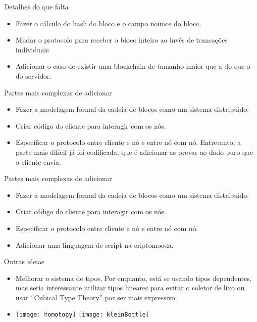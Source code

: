 \documentclass{beamer}
\begin{document}
\begin{frame}{Detalhes do que falta}
  \begin{itemize}
    \item Fazer o cálculo do hash do bloco e o campo nounce do bloco.
    \item Mudar o protocolo para receber o bloco inteiro ao invés de transações individuais
    \item Adicionar o caso de existir uma blockchain de tamanho maior que a do que a do servidor.
  \end{itemize}
\end{frame}

\begin{frame}{Partes mais complexas de adicionar}
  \begin{itemize}
    \item Fazer a modelagem formal da cadeia de blocos como um sistema distribuido.
    \item Criar código do cliente para interagir com os nós.
    \item Especificar o protocolo entre cliente e nó e entre nó com nó.
      Entretanto, a parte mais difícil já foi codificada, que é adicionar as provas
      ao dado puro que o cliente envia.
  \end{itemize}
\end{frame}

\begin{frame}{Partes mais complexas de adicionar}
  \begin{itemize}
    \item Fazer a modelagem formal da cadeia de blocos como um sistema distribuido.
    \item Criar código do cliente para interagir com os nós.
    \item Especificar o protocolo entre cliente e nó e entre nó com nó.
    \item Adicionar uma linguagem de script na criptomoeda.
  \end{itemize}
\end{frame}

\begin{frame}{Outras ideias}
  \begin{itemize}
    \item Melhorar o sistema de tipos.
    Por enquanto, está se usando tipos dependentes, mas seria interessante utilizar tipos lineares
    para evitar o coletor de lixo ou usar \foreignquote{english}{Cubical Type Theory} por ser mais expressivo.
  \item
    \texttt{[image: homotopy]}
    \texttt{[image: kleinBottle]}
  \end{itemize}
\end{frame}
\end{document}
